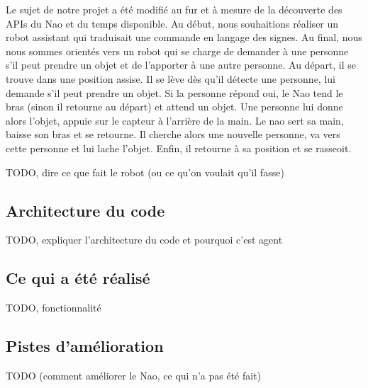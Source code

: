 \documentclass{article}
\begin{document}
Le sujet de notre projet a été modifié au fur et à mesure de la découverte des APIs du Nao et du temps disponible. Au début, nous souhaitions réaliser un robot assistant qui traduisait une commande en langage des signes. Au final, nous nous sommes orientés vers un robot qui se charge de demander à une personne s'il peut prendre un objet et de l'apporter à une autre personne. Au départ, il se trouve dans une position assise. Il se lève dès qu'il détecte une personne, lui demande s'il peut prendre un objet. Si la personne répond oui, le Nao tend le bras (sinon il retourne au départ) et attend un objet. Une personne lui donne alors l'objet, appuie sur le capteur à l'arrière de la main. Le nao sert sa main, baisse son bras et se retourne. Il cherche alors une nouvelle personne, va vers cette personne et lui lache l'objet. Enfin, il retourne à sa position et se rasseoit.

TODO, dire ce que fait le robot (ou ce qu'on voulait qu'il fasse)
\subsection{Architecture du code}
TODO, expliquer l'architecture du code et pourquoi c'est agent
\subsection{Ce qui a été réalisé}
TODO, fonctionnalité
\subsection{Pistes d'amélioration}
TODO (comment améliorer le Nao, ce qui n'a pas été fait)
\end{document}
